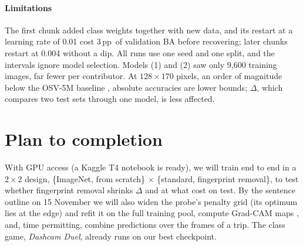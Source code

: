 \documentclass[9pt]{extarticle}
\newcommand{\pp}{\,pp}
\begin{document}
\paragraph{Limitations} The first chunk added class weights together with new data, and its
restart at a learning rate of 0.01 cost 3\pp\ of validation BA before recovering; later
chunks restart at 0.004 without a dip. All runs use one seed and one split, and the intervals
ignore model selection. Models (1) and (2) saw only 9{,}600 training images, far fewer per
contributor. At $128\times170$ pixels, an order of magnitude below
the OSV-5M baseline \citep{astruc2024osv5m}, absolute accuracies are lower bounds; $\Delta$,
which compares two test sets through one model, is less affected.

\section{Plan to completion}
\label{sec:plan}
With GPU access (a Kaggle T4 notebook is ready), we will train end to end in a
$2\times2$ design, \{ImageNet, from scratch\} $\times$ \{standard, fingerprint removal\}, to
test whether fingerprint removal shrinks $\Delta$ and at what cost on test. By the sentence
outline on 15 November we will also widen the probe's penalty grid (its optimum lies at the
edge) and refit it on the full training pool, compute Grad-CAM maps
\citep{selvaraju2017gradcam}, and, time permitting, combine predictions over the frames of a
trip. The class game, \emph{Dashcam Duel}, already runs on our best checkpoint.



\end{document}
